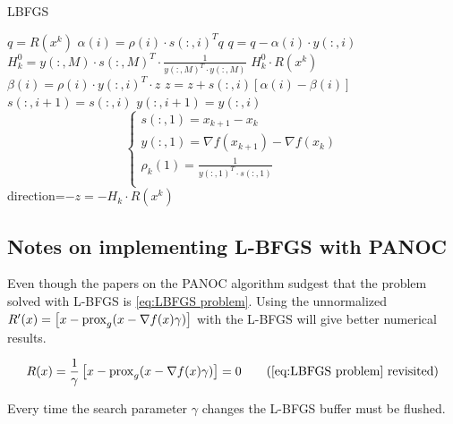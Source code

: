 		\begin{algorithm}
			\caption{LBFGS}
			\label{alg:LBFGS}
			\begin{algorithmic}[1]
				\State $q = R(x^k)$
				\State $\alpha(i)=\rho(i) \cdot s(:,i)^Tq$
				\State $q = q - \alpha(i) \cdot y(:,i)$
				\EndFor
				\State $H_k^0 = y(:,M) \cdot s(:,M)^T \cdot  \frac{1}{y(:,M)^T \cdot y(:,M)}$
				\State $H^0_k \cdot R(x^k)$
				\State $\beta(i) = \rho(i) \cdot y(:,i)^T \cdot z$
				\State $z = z + s(:,i)[\alpha(i)-\beta(i)]$
				\EndFor
				\State $s(:,i+1)=s(:,i)$
				\State $y(:,i+1)=y(:,i)$
				\EndFor
				\State $$\begin{cases}
				s(:,1) = x_{k+1} - x_k \\
				y(:,1) = \nabla f(x_{k+1}) - \nabla f(x_k)\\
				\rho_k(1) = \frac{1}{y(:,1)^T \cdot s(:,1)} \\ 
				\end{cases}
				$$
				\State \Return direction=$-z=-H_k \cdot R(x^k)$
				\EndProcedure
			\end{algorithmic}
		\end{algorithm}
	
	\subsection{Notes on implementing L-BFGS with PANOC}
	Even though the papers on the PANOC algorithm sudgest that the problem solved with L-BFGS is \eqref{eq:LBFGS problem}. Using the unnormalized $R'(x) = \left[ x - \operatorname{prox}_g( x - \nabla f(x)\gamma) \right]$ with the L-BFGS will give better numerical results.
	
	\begin{equation}
	R(x) = \frac{1}{\gamma}\left[ x - \prox_g( x - \nabla f(x)\gamma) \right] = 0
	\tag{\eqref{eq:LBFGS problem} revisited}
	\end{equation}
	
	Every time the search parameter $\gamma$ changes the L-BFGS buffer must be flushed.
